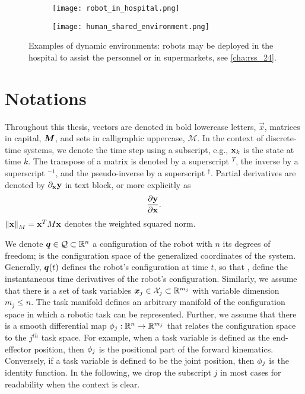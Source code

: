 \begin{figure}[h]
  \centering
  \begin{subfigure}[b]{0.6\textwidth}
    \texttt{[image: robot\_in\_hospital.png]}
  \end{subfigure}
  \hfill
  \begin{subfigure}[b]{0.3\textwidth}
    \texttt{[image: human\_shared\_environment.png]}
  \end{subfigure}
  \caption{Examples of dynamic environments: robots may be
  deployed in the hospital to assist the personnel
  \cite{mivseikis2020lio} or in supermarkets, see
  \cref{cha:rss_24}.}
  \label{fig:dynamic_environments}
\end{figure}



\section{Notations} %
\label{sec:notations}

Throughout this thesis, vectors are denoted in bold lowercase
letters, $\vec{x}$, matrices in capital, $\bm{M}$, and sets
in calligraphic uppercase, $\mathcal{M}$. In the context of
discrete-time systems, we denote the time step using a
subscript, e.g., $\mathbf{x}_k$ is the state at time $k$. The
transpose of a matrix is denoted by a superscript $^T$, 
the inverse by a superscript $^{-1}$, and the pseudo-inverse by a
superscript $^{\dagger}$. Partial derivatives are denoted by 
$\partial_{\mathbf{x}}\mathbf{y}$ in text block, or more explicitly as
\[\frac{\partial\mathbf{y}}{\partial\mathbf{x}}.\]
 $\left\lVert\mathbf{x}\right\rVert_M = \mathbf{x}^TM\mathbf{x}$
denotes the weighted squared norm. 


We denote $\bm{q}\in\mathcal{Q}\subset\mathbb{R}^n$ a configuration of the robot
with $n$ its degrees of freedom; \Q{} is the configuration
space of the generalized coordinates of the system.
Generally, $\bm{q}(t)$ defines the robot's configuration at time
$t$, so that \qdot{}, \qddot{} define the instantaneous time
derivatives of the robot's configuration. Similarly, we
assume that there is a set of task variables
$\bm{x}_j\in\mathcal{X}_j\subset\mathbb{R}^{m_j}$ with variable dimension $m_j \leq n$.
The task manifold \Xj{} defines an arbitrary manifold of the
configuration space \Q{} in which a robotic task can be
represented. Further, we assume that there is a smooth differential
map $\phi_j:\mathbb{R}^n\rightarrow\mathbb{R}^{m_j}$ that relates the
configuration space to the $j^{th}$ task space. For example,
when a task variable is defined as the end-effector
position, then $\phi_j$ is the positional part of the
forward kinematics. Conversely,
if a task variable is
defined to be the joint position, then $\phi_j$ is the
identity function. In the following, we drop the subscript
$j$ in most cases for readability when the context is clear.

